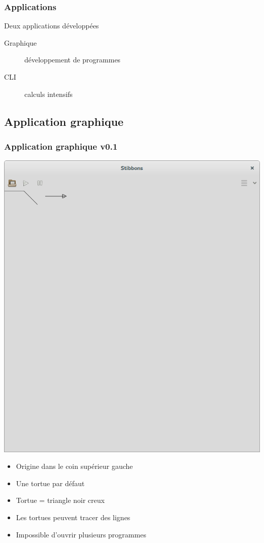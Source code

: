 \begin{frame}
\frametitle{Applications}
Deux applications développées
\begin{description}
	\item [Graphique] développement de programmes
	\item [CLI] calculs intensifs
\end{description}
\end{frame}

\subsection{Application graphique}

\begin{frame}
\frametitle{Application graphique v0.1}
\begin{center}
\includegraphics[scale=0.16]{doc/Presentation/screenshot/stibbons-0-1-2.png}
\end{center}

\begin{itemize}
	\item Origine dans le coin supérieur gauche
	\item Une tortue par défaut
	\item Tortue = triangle noir creux
	\item Les tortues peuvent tracer des lignes
	\item Impossible d'ouvrir plusieurs programmes
\end{itemize}
\end{frame}


